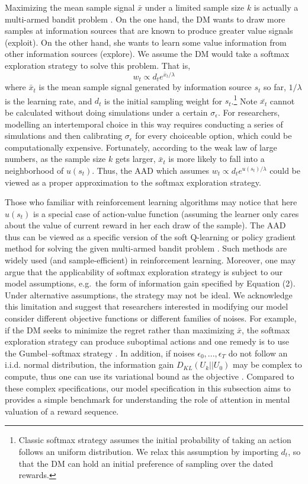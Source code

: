\documentclass[
  12pt,
]{article}
\begin{document}
Maximizing the mean sample signal \(\bar{x}\) under a limited sample
size \(k\) is actually a multi-armed bandit problem
\citep[][Ch.2]{sutton2018reinforcement}. On the one hand, the DM wants
to draw more samples at information sources that are known to produce
greater value signals (exploit). On the other hand, she wants to learn
some value information from other information sources (explore). We
assume the DM would take a softmax exploration strategy to solve this
problem. That is,\[
w_t \propto d_t e^{\bar{x}_t/\lambda}
\]where \(\bar{x}_t\) is the mean sample signal generated by information
source \(s_t\) so far, \(1/\lambda\) is the learning rate, and \(d_t\)
is the initial sampling weight for \(s_t\).\footnote{Classic softmax
  strategy assumes the initial probability of taking an action follows
  an uniform distribution. We relax this assumption by importing
  \(d_t\), so that the DM can hold an initial preference of sampling
  over the dated rewards.} Note \(\bar{x_t}\) cannot be calculated
without doing simulations under a certain \(\sigma_\epsilon\). For
researchers, modelling an intertemporal choice in this way requires
conducting a series of simulations and then calibrating
\(\sigma_\epsilon\) for every choiceable option, which could be
computationally expensive. Fortunately, according to the weak law of
large numbers, as the sample size \(k\) gets larger, \(\bar{x}_t\) is
more likely to fall into a neighborhood of \(u(s_t)\). Thus, the AAD
which assumes \(w_t \propto d_t e^{u(s_t)/\lambda}\) could be viewed as
a proper approximation to the softmax exploration strategy.

Those who familiar with reinforcement learning algorithms may notice
that here \(u(s_t)\) is a special case of action-value function
(assuming the learner only cares about the value of current reward in
her each draw of the sample). The AAD thus can be viewed as a specific
version of the soft Q-learning or policy gradient method for solving the
given multi-armed bandit problem
\citep{haarnoja2017reinforcement, schulman2017equivalence}. Such methods
are widely used (and sample-efficient) in reinforcement learning.
Moreover, one may argue that the applicability of softmax exploration
strategy is subject to our model assumptions, e.g.~the form of
information gain specified by Equation (2). Under alternative
assumptions, the strategy may not be ideal. We acknowledge this
limitation and suggest that researchers interested in modifying our
model consider different objective functions or different families of
noises. For example, if the DM seeks to minimize the regret rather than
maximizing \(\bar{x}\), the softmax exploration strategy can produce
suboptimal actions and one remedy is to use the Gumbel--softmax strategy
\citep{cesa2017boltzmann}. In addition, if noises
\(\epsilon_0,...,\epsilon_T\) do not follow an i.i.d. normal
distribution, the information gain \(D_{KL}(U_k||U_0)\) may be complex
to compute, thus one can use its variational bound as the objective
\citep{houthooft2016vime}. Compared to these complex specifications, our
model specification in this subsection aims to provides a simple
benchmark for understanding the role of attention in mental valuation of
a reward sequence.
\end{document}
